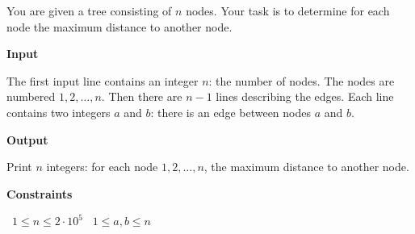 You are given a tree consisting of $n$ nodes.
Your task is to determine for each node the maximum distance to another node.

\vspace{0.3cm}\noindent\textbf{Input}

The first input line contains an integer $n$: the number of nodes. The nodes are numbered $1,2,\ldots,n$.
Then there are $n-1$ lines describing the edges. Each line contains two integers $a$ and $b$: there is an edge between nodes $a$ and $b$.

\vspace{0.3cm}\noindent\textbf{Output}

Print $n$ integers: for each node $1,2,\ldots,n$, the maximum distance to another node.

\vspace{0.3cm}\noindent\textbf{Constraints}

\textbullet\ $1 \le n \le 2 \cdot 10^5$
\textbullet\ $1 \le a,b \le n$